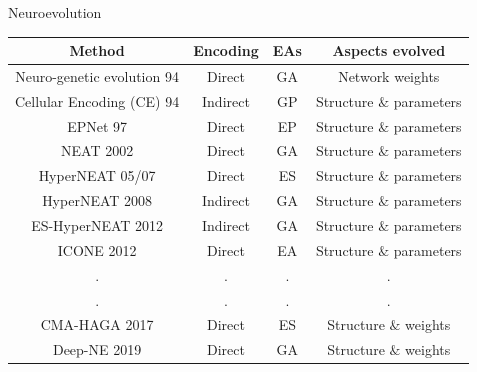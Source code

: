 \begin{frame}{Neuroevolution}
\begin{tabular}{||c|c|c|c||}
\hline
Method & Encoding & EAs & Aspects evolved \\ 
\hline\hline
     Neuro-genetic evolution 94 & Direct & GA & Network weights \\
     \hline
     Cellular Encoding (CE) 94 & Indirect & GP & Structure $\&$ parameters \\
     \hline
     EPNet 97 & Direct & EP & Structure $\&$ parameters \\
     \hline
     NEAT 2002 & Direct & GA & Structure $\&$ parameters \\
     \hline
     HyperNEAT 05/07 & Direct & ES & Structure $\&$ parameters \\
     \hline
     HyperNEAT 2008 & Indirect & GA & Structure $\&$ parameters \\
     \hline
     ES-HyperNEAT 2012 & Indirect & GA & Structure $\&$ parameters \\
     \hline
     ICONE 2012 & Direct & EA & Structure $\&$ parameters \\
     \hline
     . & . & . & . \\
     \hline
     . & . & . & . \\
     \hline
     CMA-HAGA 2017 & Direct & ES & Structure $\&$ weights \\
     \hline
     Deep-NE 2019 & Direct & GA & Structure $\&$ weights \\
     \hline
\end{tabular}
\\~\\
\end{frame}

